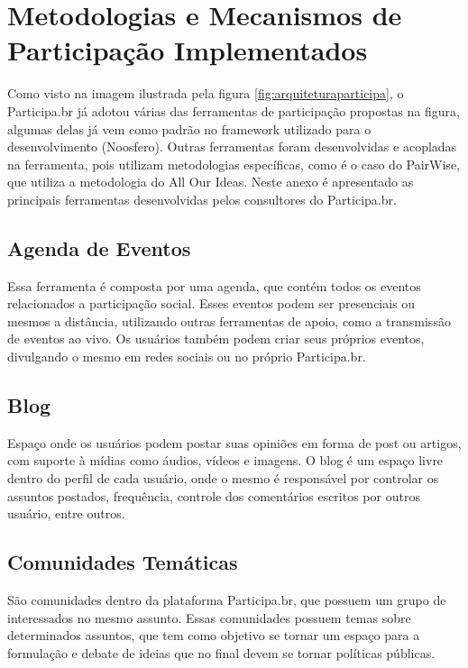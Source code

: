 
\chapter{Metodologias e Mecanismos de Participação Implementados}
\label{Att:ferramentasparticipacao}

Como visto na imagem ilustrada pela figura \ref{fig:arquiteturaparticipa}, o Participa.br já adotou várias das ferramentas de participação propostas na figura, algumas delas já vem como padrão no framework utilizado para o desenvolvimento (Noosfero). Outras ferramentas foram desenvolvidas e acopladas na ferramenta, pois utilizam metodologias específicas, como é o caso do PairWise, que utiliza a metodologia do All Our Ideas. Neste anexo é apresentado as principais ferramentas desenvolvidas pelos consultores do Participa.br.

\section*{Agenda de Eventos}

Essa ferramenta é composta por uma agenda, que contém todos os eventos relacionados a participação social. Esses eventos podem ser presenciais ou mesmos a distância, utilizando outras ferramentas de apoio, como a transmissão de eventos ao vivo. Os usuários também podem criar seus próprios eventos, divulgando o mesmo em redes sociais ou no próprio Participa.br.

\section*{Blog}

Espaço onde os usuários podem postar suas opiniões em forma de post ou artigos, com suporte à mídias como áudios, vídeos e imagens. O blog é um espaço livre dentro do perfil de cada usuário, onde o mesmo é responsável por controlar os assuntos postados, frequência, controle dos comentários escritos por outros usuário, entre outros.

\section*{Comunidades Temáticas}

São comunidades dentro da plataforma Participa.br, que possuem um grupo de interessados no mesmo assunto. Essas comunidades possuem temas sobre determinados assuntos, que tem como objetivo se tornar um espaço para a formulação e debate de ideias que no final devem se tornar políticas públicas.

